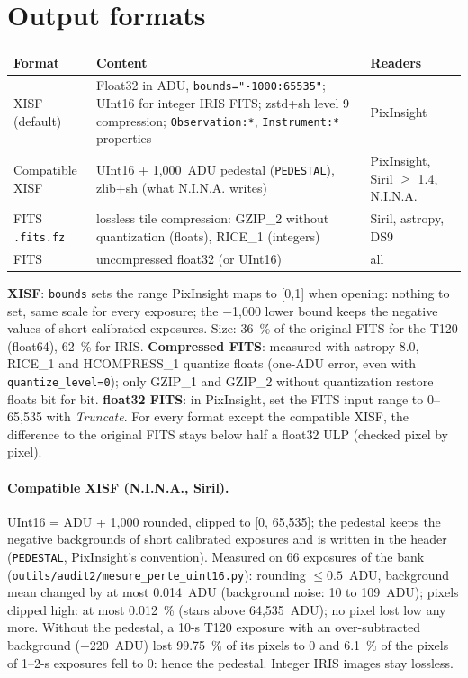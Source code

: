 \section{Output formats}
\begin{center}\small
\begin{tabularx}{\linewidth}{@{}lXl@{}}
\toprule
\textbf{Format} & \textbf{Content} & \textbf{Readers}\\
\midrule
XISF (default) & Float32 in ADU, \texttt{bounds="-1000:65535"}; UInt16 for integer IRIS FITS; zstd+sh level 9 compression; \texttt{Observation:*}, \texttt{Instrument:*} properties & PixInsight\\
Compatible XISF & UInt16 + 1,000~ADU pedestal (\texttt{PEDESTAL}), zlib+sh (what N.I.N.A. writes) & PixInsight, Siril $\geq$ 1.4, N.I.N.A.\\
FITS \texttt{.fits.fz} & lossless tile compression: GZIP\_2 without quantization (floats), RICE\_1 (integers) & Siril, astropy, DS9\\
FITS & uncompressed float32 (or UInt16) & all\\
\bottomrule
\end{tabularx}
\end{center}
\textbf{XISF}: \texttt{bounds} sets the range PixInsight maps to [0,1] when opening: nothing to set, same scale for
every exposure; the −1,000 lower bound keeps the negative values of short calibrated exposures. Size: 36~\% of the
original FITS for the T120 (float64), 62~\% for IRIS. \textbf{Compressed FITS}: measured with astropy 8.0, RICE\_1
and HCOMPRESS\_1 quantize floats (one-ADU error, even with \texttt{quantize\_level=0}); only GZIP\_1 and GZIP\_2
without quantization restore floats bit for bit. \textbf{float32 FITS}: in PixInsight, set the FITS input range to
0–65,535 with \emph{Truncate}. For every format except the compatible XISF, the difference to the original FITS
stays below half a float32 ULP (checked pixel by pixel).

\paragraph{Compatible XISF (N.I.N.A., Siril).} UInt16 = ADU + 1,000 rounded, clipped to [0, 65,535]; the pedestal
keeps the negative backgrounds of short calibrated exposures and is written in the header (\texttt{PEDESTAL},
PixInsight's convention). Measured on 66 exposures of the bank (\texttt{outils/audit2/mesure\_perte\_uint16.py}):
rounding $\le 0.5$~ADU, background mean changed by at most 0.014~ADU (background noise: 10 to 109~ADU); pixels
clipped high: at most 0.012~\% (stars above 64,535~ADU); no pixel lost low any more. Without the pedestal, a 10-s
T120 exposure with an over-subtracted background (−220~ADU) lost 99.75~\% of its pixels to 0 and 6.1~\% of the pixels
of 1–2-s exposures fell to 0: hence the pedestal. Integer IRIS images stay lossless.

